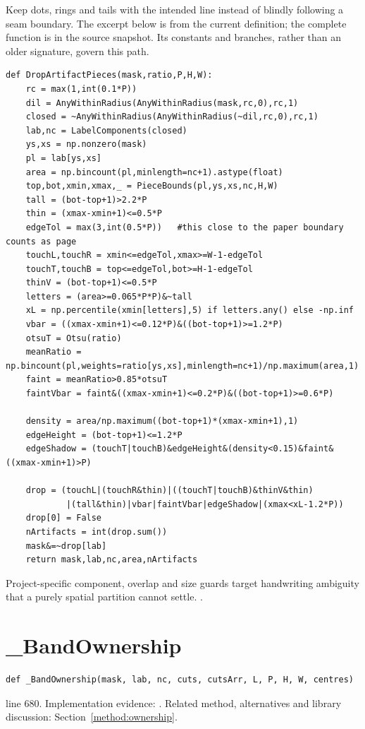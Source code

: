 Keep dots, rings and tails with the intended line instead of blindly following a seam boundary. The excerpt below is from the current definition; the complete function is in the source snapshot. Its constants and branches, rather than an older signature, govern this path.


\begin{lstlisting}[style=plain]
def DropArtifactPieces(mask,ratio,P,H,W):
    rc = max(1,int(0.1*P))
    dil = AnyWithinRadius(AnyWithinRadius(mask,rc,0),rc,1)
    closed = ~AnyWithinRadius(AnyWithinRadius(~dil,rc,0),rc,1)
    lab,nc = LabelComponents(closed)
    ys,xs = np.nonzero(mask)
    pl = lab[ys,xs]
    area = np.bincount(pl,minlength=nc+1).astype(float)
    top,bot,xmin,xmax,_ = PieceBounds(pl,ys,xs,nc,H,W)
    tall = (bot-top+1)>2.2*P
    thin = (xmax-xmin+1)<=0.5*P
    edgeTol = max(3,int(0.5*P))   #this close to the paper boundary counts as page
    touchL,touchR = xmin<=edgeTol,xmax>=W-1-edgeTol
    touchT,touchB = top<=edgeTol,bot>=H-1-edgeTol
    thinV = (bot-top+1)<=0.5*P
    letters = (area>=0.065*P*P)&~tall
    xL = np.percentile(xmin[letters],5) if letters.any() else -np.inf
    vbar = ((xmax-xmin+1)<=0.12*P)&((bot-top+1)>=1.2*P)
    otsuT = Otsu(ratio)
    meanRatio = np.bincount(pl,weights=ratio[ys,xs],minlength=nc+1)/np.maximum(area,1)
    faint = meanRatio>0.85*otsuT
    faintVbar = faint&((xmax-xmin+1)<=0.2*P)&((bot-top+1)>=0.6*P)

    density = area/np.maximum((bot-top+1)*(xmax-xmin+1),1)
    edgeHeight = (bot-top+1)<=1.2*P
    edgeShadow = (touchT|touchB)&edgeHeight&(density<0.15)&faint&((xmax-xmin+1)>P)

    drop = (touchL|(touchR&thin)|((touchT|touchB)&thinV&thin)
            |(tall&thin)|vbar|faintVbar|edgeShadow|(xmax<xL-1.2*P))
    drop[0] = False
    nArtifacts = int(drop.sum())
    mask&=~drop[lab]
    return mask,lab,nc,area,nArtifacts
\end{lstlisting}
Project-specific component, overlap and size guards target handwriting ambiguity that a purely spatial partition cannot settle. \cite{code2026,opencvshape}.


\section{\_BandOwnership}\label{fn:segment:-BandOwnership}
\begin{lstlisting}[style=sig]
def _BandOwnership(mask, lab, nc, cuts, cutsArr, L, P, H, W, centres)
\end{lstlisting}
 line 680. Implementation evidence: \cite{code2026}. Related method, alternatives and library discussion: Section~\ref{method:ownership}.


